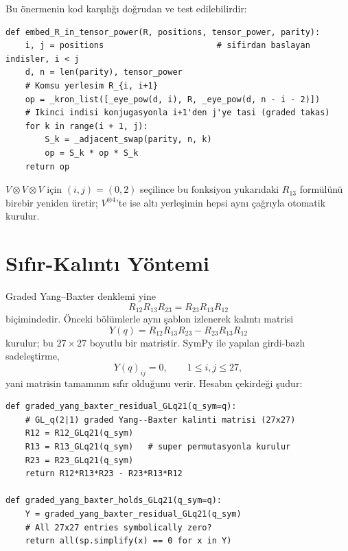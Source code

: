 \documentclass[12pt,a4paper,fleqn]{report}
\newcommand{\normalsemi}{;}
\newcommand{\normalsemi}{\begingroup\semicolonfont;\endgroup}
\numberwithin{equation}{chapter}
\theoremstyle{plain}
\theoremstyle{definition}
\begin{document}
Bu önermenin kod karşılığı doğrudan ve test edilebilirdir:

\begin{lstlisting}[style=pyblock,caption={$R$-Matrisini $V^{\otimes n}$ İçinde $(i,j)$ Faktörlerine Gömme}]
def embed_R_in_tensor_power(R, positions, tensor_power, parity):
    i, j = positions                       # sifirdan baslayan indisler, i < j
    d, n = len(parity), tensor_power
    # Komsu yerlesim R_{i, i+1}
    op = _kron_list([_eye_pow(d, i), R, _eye_pow(d, n - i - 2)])
    # Ikinci indisi konjugasyonla i+1'den j'ye tasi (graded takas)
    for k in range(i + 1, j):
        S_k = _adjacent_swap(parity, n, k)
        op = S_k * op * S_k
    return op
\end{lstlisting}

$V\otimes V\otimes V$ için $(i,j)=(0,2)$ seçilince bu fonksiyon yukarıdaki
$R_{13}$ formülünü birebir yeniden üretir\normalsemi{} $V^{\otimes 4}$'te ise altı
yerleşimin hepsi aynı çağrıyla otomatik kurulur.

\section{Sıfır-Kalıntı Yöntemi}

Graded Yang--Baxter denklemi yine
\begin{equation}
R_{12}R_{13}R_{23}=R_{23}R_{13}R_{12}
\end{equation}
biçimindedir. Önceki bölümlerle aynı şablon izlenerek kalıntı matrisi
\begin{equation}
Y(q)=R_{12}R_{13}R_{23}-R_{23}R_{13}R_{12}
\end{equation}
kurulur\normalsemi{} bu $27\times 27$ boyutlu bir matristir. SymPy ile yapılan girdi-bazlı
sadeleştirme,
\begin{equation}
Y(q)_{ij}=0,\qquad 1\leq i,j\leq 27,
\end{equation}
yani matrisin tamamının sıfır olduğunu verir. Hesabın çekirdeği şudur:

\begin{lstlisting}[style=pyblock,caption={$GL_q(2|1)$ İçin Graded Yang--Baxter Kalıntısı}]
def graded_yang_baxter_residual_GLq21(q_sym=q):
    # GL_q(2|1) graded Yang--Baxter kalinti matrisi (27x27)
    R12 = R12_GLq21(q_sym)
    R13 = R13_GLq21(q_sym)   # super permutasyonla kurulur
    R23 = R23_GLq21(q_sym)
    return R12*R13*R23 - R23*R13*R12

def graded_yang_baxter_holds_GLq21(q_sym=q):
    Y = graded_yang_baxter_residual_GLq21(q_sym)
    # All 27x27 entries symbolically zero?
    return all(sp.simplify(x) == 0 for x in Y)
\end{lstlisting}
\end{document}
